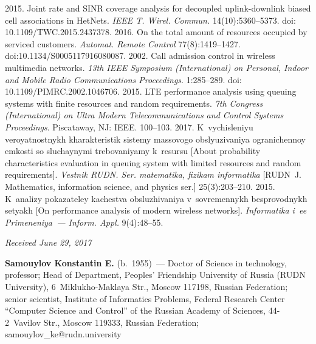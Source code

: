\begin{multicols}{2}
{{\begin{thebibliography}{99}
 2015. Joint rate and SINR coverage analysis for 
decoupled uplink-downlink biased cell associations in HetNets. \textit{IEEE T. 
Wirel. Commun.} 14(10):5360--5373. doi: 10.1109/TWC.2015.2437378.
 2016. On the total amount of 
resources occupied by serviced customers. \textit{Automat. Remote Control} 77(8):1419--1427. 
doi:10.1134/S0005117916080087. 
 2002. Call admission control in wireless multimedia 
networks. \textit{13th IEEE Symposium (International) on Personal, Indoor and Mobile 
Radio Communications Proceedings}. 1:285--289. doi: 10.1109/PIMRC.2002.1046706.
2015. LTE performance analysis using queuing systems with finite resources and random 
requirements. \textit{7th Congress (International) on Ultra Modern Telecommunications and 
Control Systems Proceedings}. Piscataway, NJ: IEEE. 100--103. 
 2017. K~vychisleniyu veroyatnostnykh kha\-rak\-te\-ri\-stik sistemy massovogo 
obslyuzivaniya ogra\-ni\-chen\-noy emkosti so sluchaynymi trebovaniyamy k~re\-sur\-su [About 
probability characteristics evaluation in queuing system with limited resources and random 
requirements]. \textit{Vestnik RUDN. Ser. matematika, fizikam informatika} [RUDN~J. 
Mathematics, information science, and physics ser.] 25(3):203--210.
 2015. K~analizy pokazateley 
kachestva obsluzhivaniya v~sovremennykh besprovodnykh setyakh [On performance analysis 
of modern wireless networks]. \textit{Informatika i~ee Primeneniya~--- Inform. Appl.} 
9(4):48--55.  

\end{thebibliography}

 }
 }

\end{multicols}

\vspace*{-6pt}

\hfill{\small\textit{Received June 29, 2017}}

\vspace*{-10pt}


\Contr

\noindent
\textbf{Samouylov Konstantin E.} (b.\ 1955)~--- Doctor of Science in technology, professor; 
Head of Department, Peoples' Friendship University of Russia (RUDN University), 
6~Miklukho-Maklaya Str., Moscow 117198, Russian Federation; senior scientist, Institute of 
Informatics Problems, Federal Research Center ``Computer Science and Control'' of the Russian 
Academy of Sciences, 44-2~Vavilov Str., Moscow 119333, Russian Federation;  
\mbox{samouylov\_ke@rudn.university} 

